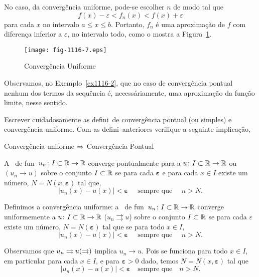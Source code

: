No caso, da convergência uniforme, pode-se escolher $n$ de
modo tal que
\[
f(x) -\varepsilon<f_n(x)<f(x) +\varepsilon
\]
para cada $x$ no intervalo $a\leq x \leq b$. Portanto, $f_n$ é uma
aproximação de $f$ com diferença inferior a $\varepsilon$, no
intervalo todo, como o mostra a Figura~\ref{fig-1116-7}.
\begin{figure}[H]
\centering
\texttt{[image: fig-1116-7.eps]}
\caption{Convergência Uniforme}
\label{fig-1116-7}
\end{figure}

Observamos, no Exemplo~\ref{ex1116-2}, que no caso de convergência
pontual nenhum dos termos da sequência é, necessáriamente, uma
aproximação da função limite, nesse sentido.

\begin{exer}
Escrever cuidadosamente as defini\coes\ de converg\^encia pontual
(ou simples) e converg\^encia uniforme. Com as defini\coes\
anteriores verifique a seguinte implicação,
\begin{center}
Converg\^encia uniforme $\Rightarrow$ Converg\^encia Pontual
\end{center}
\end{exer}

\solo A \seq\ de fun\coes\ $u_n\colon I\subset \mathbb{R}\to \mathbb{R}$ converge
pontualmente para a $u\colon I\subset \mathbb{R}\to \mathbb{R} $ ou $(u_n\to u)$
sobre o conjunto $I\subset \mathbb{R}$ se para cada $\mathbf{\varepsilon}$
e para cada $x\in I$ existe um n\'umero, $N=
N(x,\mathbf{\varepsilon})$ tal que,
\begin{equation*}
|u_n(x)-u(x)|<\mathbf{\varepsilon}\quad \text{ sempre que } \quad n>N.
\end{equation*}


Definimos a converg\^encia uniforme: a \seq\
de fun\coes\ $u_n\colon I\subset \mathbb{R}\to \mathbb{R}$ converge uniformemente
a $u\colon I\subset \mathbb{R}\to \mathbb{R}$ ($u_n\rightrightarrows u$) sobre o
conjunto $I\subset \mathbb{R}$ se para cada $\varepsilon$ existe um
n\'umero, $N= N(\mathbf{\varepsilon})$ tal que se para todo $x\in
I$,
\begin{equation*}
|u_n(x)-u(x)|<\mathbf{\varepsilon}\quad \text{ sempre que } \quad n>N.
\end{equation*}

Observamos que $u_n \rightrightarrows u (\rightrightarrows)$ implica $u_n \to u$. Pois se funciona para todo $x\in I$, em particular para cada $x\in I$, 
e para $\mathbf{\varepsilon}>0$ dado,  temos $N=N(x, \mathbf{\varepsilon})$ tal que
\begin{equation*}
|u_n(x)-u(x)|<\mathbf{\varepsilon}\quad \text{sempre que}\quad n>N.
\end{equation*}

